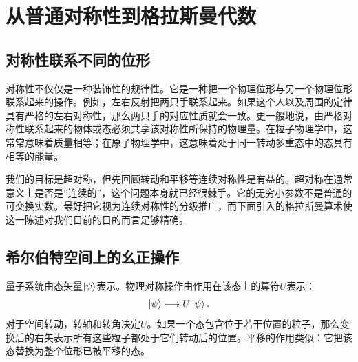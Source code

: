 \chapter{从普通对称性到格拉斯曼代数}


\section{对称性联系不同的位形}

对称性不仅仅是一种装饰性的规律性。它是一种把一个物理位形与另一个物理位形联系起来的操作。例如，左右反射把两只手联系起来。如果这个人以及周围的定律具有严格的左右对称性，那么两只手的对应性质就会一致。更一般地说，由严格对称性联系起来的物体或态必须共享该对称性所保持的物理量。在粒子物理学中，这常常意味着质量相等；在原子物理学中，这意味着处于同一转动多重态中的态具有相等的能量。

我们的目标是超对称，但先回顾转动和平移等连续对称性是有益的。超对称在通常意义上是否是“连续的”，这个问题本身就已经很棘手。它的无穷小参数不是普通的可交换实数。最好把它视为连续对称性的分级推广，而下面引入的格拉斯曼算术使这一陈述对我们目前的目的而言足够精确。

\section{希尔伯特空间上的幺正操作}

量子系统由态矢量\(\left\lvert\psi\right\rangle\)表示。物理对称操作由作用在该态上的算符\(U\)表示：
\begin{equation}
\left\lvert\psi\right\rangle\longmapsto U\left\lvert\psi\right\rangle.
\end{equation}
对于空间转动，转轴和转角决定\(U\)。如果一个态包含位于若干位置的粒子，那么变换后的右矢表示所有这些粒子都处于它们转动后的位置。平移的作用类似：它把该态替换为整个位形已被平移的态。

\begin{classroomqa}
\end{classroomqa}

